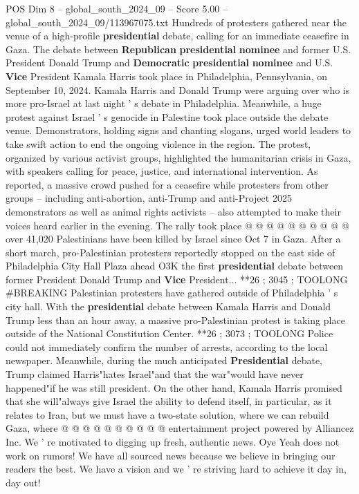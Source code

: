 \begin{textsample}{POS Dim 8 – global\_south\_2024\_09 – Score 5.00 – global\_south\_2024\_09/113967075.txt}  \label{ex:f8_pos_256}
Hundreds of protesters gathered near the venue of a high-profile \textbf{presidential} debate, calling for an immediate ceasefire in Gaza.
The debate between \textbf{Republican} \textbf{presidential} \textbf{nominee} and former U.S.
President Donald Trump and \textbf{Democratic} \textbf{presidential} \textbf{nominee} and U.S. \textbf{Vice} President Kamala Harris took place in Philadelphia, Pennsylvania, on September 10, 2024.
Kamala Harris and Donald Trump were arguing over who is more pro-Israel at last night ' s debate in Philadelphia.
Meanwhile, a huge protest against Israel ' s genocide in Palestine took place outside the debate venue.
Demonstrators, holding signs and chanting slogans, urged world leaders to take swift action to end the ongoing violence in the region.
The protest, organized by various activist groups, highlighted the humanitarian crisis in Gaza, with speakers calling for peace, justice, and international intervention.
As reported, a massive crowd pushed for a ceasefire while protesters from other groups -- including anti-abortion, anti-Trump and anti-Project 2025 demonstrators as well as animal rights activists -- also attempted to make their voices heard earlier in the evening.
The rally took place @ @ @ @ @ @ @ @ @ @ over 41,020 Palestinians have been killed by Israel since Oct 7 in Gaza.
After a short march, pro-Palestinian protesters reportedly stopped on the east side of Philadelphia City Hall Plaza ahead O3K the first \textbf{presidential} debate between former President Donald Trump and \textbf{Vice} President... **26 ; 3045 ; TOOLONG \#BREAKING Palestinian protesters have gathered outside of Philadelphia ' s city hall.
With the \textbf{presidential} debate between Kamala Harris and Donald Trump less than an hour away, a massive pro-Palestinian protest is taking place outside of the National Constitution Center. **26 ; 3073 ; TOOLONG Police could not immediately confirm the number of arrests, according to the local newspaper.
Meanwhile, during the much anticipated \textbf{Presidential} debate, Trump claimed Harris"hates Israel"and that the war"would have never happened"if he was still president.
On the other hand, Kamala Harris promised that she will"always give Israel the ability to defend itself, in particular, as it relates to Iran, but we must have a two-state solution, where we can rebuild Gaza, where @ @ @ @ @ @ @ @ @ @ entertainment project powered by Alliancez Inc.
We ' re motivated to digging up fresh, authentic news.
Oye Yeah does not work on rumors!
We have all sourced news because we believe in bringing our readers the best.
We have a vision and we ' re striving hard to achieve it day in, day out!

\end{textsample}
